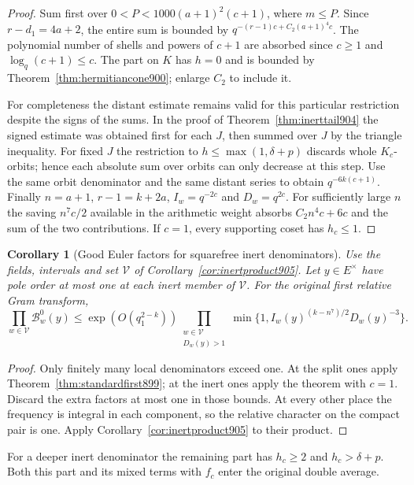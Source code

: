 \documentclass[a4paper,11pt]{article}
\newtheorem{corollary}[proposition]{Corollary}
\theoremstyle{definition}
\theoremstyle{remark}
\numberwithin{equation}{section}
\begin{document}
\begin{proof}
Sum first over \(0<P<1000(a+1)^2(c+1)\), where \(m\le P\).
Since \(r-d_1=4a+2\), the entire sum is bounded by
\(q^{-(r-1)c+C_2(a+1)^4c}\). The polynomial number of shells
and powers of \(c+1\) are absorbed since \(c\ge1\) and
\(\log_q(c+1)\le c\). The part on \(K\) has \(h=0\) and
is bounded by Theorem~\ref{thm:hermitiancone900}; enlarge
\(C_2\) to include it.

For completeness the distant estimate remains valid for this
particular restriction despite the signs of the sums.
In the proof of Theorem~\ref{thm:inerttail904} the signed
estimate was obtained first for each \(J\), then summed over
\(J\) by the triangle inequality. For fixed \(J\) the restriction
to \(h\le\max(1,\delta+p)\) discards whole \(K_c\)-orbits;
hence each absolute sum over orbits can only decrease at
this step. Use the same orbit denominator and the same distant
series to obtain \(q^{-6k(c+1)}\). Finally \(n=a+1\),
\(r-1=k+2a\), \(I_w=q^{-2c}\) and \(D_w=q^{2c}\).
For sufficiently large \(n\) the saving \(n^7c/2\) available
in the arithmetic weight absorbs \(C_2n^4c+6c\) and the sum
of the two contributions. If \(c=1\), every supporting coset
has \(h_c\le1\).
\end{proof}

\begin{corollary}[Good Euler factors for squarefree inert denominators]
\leavevmode\label{cor:primeproduct906}
Use the fields, intervals and set \(\mathcal V\) of
Corollary~\ref{cor:inertproduct905}. Let \(y\in E^\times\)
have pole order at most one at each inert member of \(\mathcal V\).
For the original first relative Gram transform,
\[
      \prod_{w\in\mathcal V}\mathcal B^0_w(y)
        \le \exp(O(q_1^{2-k}))
            \prod_{\substack{w\in\mathcal V\\ D_w(y)>1}}
                   \min\{1,I_w(y)^{(k-n^7)/2}D_w(y)^{-3}\}.
\]
\end{corollary}
\begin{proof}
Only finitely many local denominators exceed one. At the split
ones apply Theorem~\ref{thm:standardfirst899}; at the inert ones
apply the theorem with \(c=1\). Discard the extra factors at
most one in those bounds. At every other place the frequency
is integral in each component, so the relative character on
the compact pair is one. Apply
Corollary~\ref{cor:inertproduct905} to their product.
\end{proof}

For a deeper inert denominator the remaining part has
\(h_c\ge2\) and \(h_c>\delta+p\). Both this part and its
mixed terms with \(f_c\) enter the original double average.
\clearpage
\end{document}
